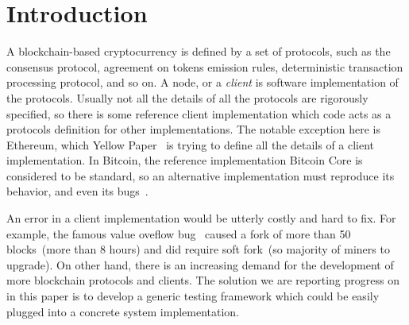 
\section{Introduction}

A blockchain-based cryptocurrency is defined by a set of protocols, such as the consensus protocol, agreement on tokens emission rules, deterministic transaction processing protocol, and so on. A node, or a {\em client} is software implementation of the protocols. Usually not all the details of all the protocols are rigorously specified, so there is some reference client implementation which code acts as a protocols definition for other implementations. The notable exception here is Ethereum, which Yellow Paper~\cite{ethyp} is trying to define all the details of a client implementation. In Bitcoin, the reference implementation Bitcoin Core is considered to be standard, so an alternative implementation must reproduce its behavior, and even its bugs~\cite{bitbugs}. 

An error in a client implementation would be utterly costly and hard to fix. For example, the famous value oveflow bug~\cite{overflow} caused a fork of more than 50 blocks~(more than 8 hours) and did require soft fork~(so majority of miners to upgrade). On other hand, there is an increasing demand for the development of more blockchain protocols and clients. The solution we are reporting progress on in this paper is to develop a generic testing framework which could be easily plugged into a concrete system implementation.  
